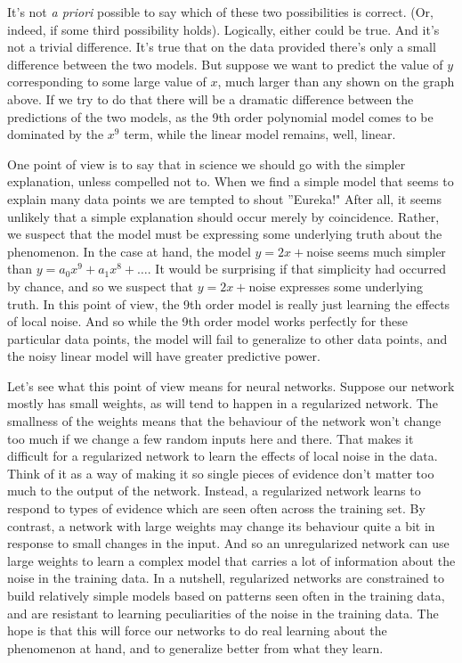 It's not \textit{a priori} possible to say which of these two possibilities is correct. (Or, indeed, if some third possibility holds). Logically, either could be true. And it's not a trivial difference. It's true that on the data provided there's only a small difference between the two models. But suppose we want to predict the value of $y$ corresponding to some large value of $x$, much larger than any shown on the graph above. If we try to do that there will be a dramatic difference between the predictions of the two models, as the 9th order polynomial model comes to be dominated by the $x^9$
term, while the linear model remains, well, linear.

One point of view is to say that in science we should go with the simpler explanation, unless compelled not to. When we find a simple model that seems to explain many data points we are tempted to shout ''Eureka!" After all, it seems unlikely that a simple explanation should occur merely by coincidence. Rather, we suspect that the model must be expressing some underlying truth about the phenomenon. 
In the case at hand, the model $y=2x+\textrm{noise}$
seems much simpler than $y=a_{0} x^{9}+a_{1} x^{8}+\ldots$. It would be surprising if that simplicity had occurred by chance, and so we suspect that  $y=2x+\textrm{noise}$ expresses some underlying truth. In this point of view, the 9th order model is really just learning the effects of local noise. And so while the 9th order model works perfectly for these particular data points, the model will fail to generalize to other data points, and the noisy linear model will have greater predictive power.

Let's see what this point of view means for neural networks. Suppose our network mostly has small weights, as will tend to happen in a regularized network. The smallness of the weights means that the behaviour of the network won't change too much if we change a few random inputs here and there. That makes it difficult for a regularized network to learn the effects of local noise in the data. Think of it as a way of making it so single pieces of evidence don't matter too much to the output of the network. Instead, a regularized network learns to respond to types of evidence which are seen often across the training set. By contrast, a network with large weights may change its behaviour quite a bit in response to small changes in the input. And so an unregularized network can use large weights to learn a complex model that carries a lot of information about the noise in the training data. In a nutshell, regularized networks are constrained to build relatively simple models based on patterns seen often in the training data, and are resistant to learning peculiarities of the noise in the training data. The hope is that this will force our networks to do real learning about the phenomenon at hand, and to generalize better from what they learn.

